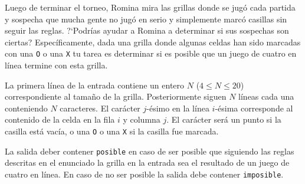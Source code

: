 \documentclass{oci}
\begin{document}
\begin{problemDescription}
\begin{center}
  \end{center}

  Luego de terminar el torneo, Romina mira
  las grillas donde se jugó cada partida
  y sospecha que mucha gente no jugó en serio y
  simplemente marcó casillas sin seguir las reglas.
  ?`Podrías ayudar a Romina a determinar si sus sospechas
  son ciertas?
  Específicamente, dada una grilla donde algunas
  celdas han sido marcadas con una \texttt{O} o una \texttt{X}
  tu tarea es determinar si es posible que un juego de cuatro en
  línea termine con esta grilla.
\end{problemDescription}

\begin{inputDescription}
  La primera línea de la entrada contiene un entero $N$ ($4\leq N \leq 20$)
  correspondiente
  al tamaño de la grilla.
  Posteriormente siguen $N$ líneas cada una conteniendo $N$ caracteres.
  El carácter $j$-ésimo en la línea $i$-ésima corresponde al contenido
  de la celda en la fila $i$ y columna $j$.
  El carácter será un punto si la casilla está vacía, o
  una \texttt{O} o una \texttt{X} si la casilla fue marcada.
\end{inputDescription}

\begin{outputDescription}
  La salida deber contener \texttt{posible} en caso de ser posible
  que siguiendo las reglas descritas en el enunciado la grilla en la
  entrada sea el resultado de un juego de cuatro en línea.
  En caso de no ser posible la salida debe contener \texttt{imposible}.
\end{outputDescription}
\end{document}
